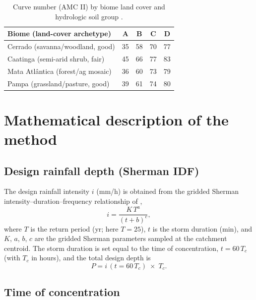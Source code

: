 \documentclass[11pt]{article}
\begin{document}
\begin{table}[h]
  \centering
  \caption{Curve number (AMC II) by biome land cover and hydrologic
    soil group \citep{NRCS2004}.}
  \label{tab:supp_cn}
  \small
  \begin{tabular}{lcccc}
    \toprule
    Biome (land-cover archetype) & A & B & C & D \\
    \midrule
    Cerrado (savanna/woodland, good)      & 35 & 58 & 70 & 77 \\
    Caatinga (semi-arid shrub, fair)      & 45 & 66 & 77 & 83 \\
    Mata Atl\^antica (forest/ag mosaic)   & 36 & 60 & 73 & 79 \\
    Pampa (grassland/pasture, good)       & 39 & 61 & 74 & 80 \\
    \bottomrule
  \end{tabular}
\end{table}

\section{Mathematical description of the method}
\label{sec:supp_math}

\subsection{Design rainfall depth (Sherman IDF)}

The design rainfall intensity $i$ (\si{mm/h}) is obtained from the
gridded Sherman intensity--duration--frequency relationship of
\citet{GomesJuniorIDF},
\begin{equation}
  i = \frac{K\,T^{a}}{(t + b)^{c}},
  \label{eq:sherman}
\end{equation}
where $T$ is the return period (yr; here $T=25$), $t$ is the storm
duration (min), and $K$, $a$, $b$, $c$ are the gridded Sherman
parameters sampled at the catchment centroid. The storm duration is set
equal to the time of concentration, $t = 60\,T_c$ (with $T_c$ in
hours), and the total design depth is
\begin{equation}
  P = i\,(t = 60\,T_c)\;\times\;T_c .
  \label{eq:depth}
\end{equation}

\subsection{Time of concentration}
\end{document}
